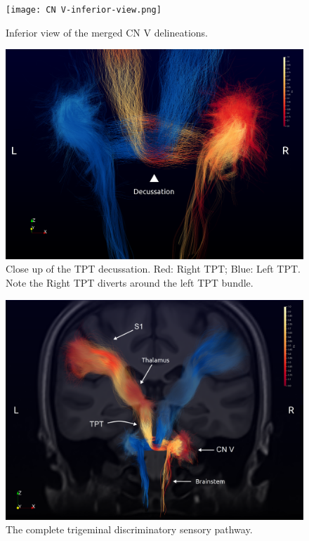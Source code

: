 \begin{figure}[ht]
\centering
\texttt{[image: CN V-inferior-view.png]}
\caption{Inferior view of the merged CN V delineations.}
\label{fig:GPfigure1}
\end{figure}

\begin{figure}[ht]
\centering
\includegraphics[width=\linewidth]{view-decussation.png}
\caption{Close up of the TPT decussation. Red: Right TPT; Blue: Left TPT. Note the Right TPT diverts around the left TPT bundle. }
\label{fig:GPfigure2}
\end{figure}

\begin{figure}[ht]
\centering
\includegraphics[width=\linewidth]{view-left-right.png}
\caption{The complete trigeminal discriminatory sensory pathway. }
\label{fig:GPfigure3}
\end{figure}

